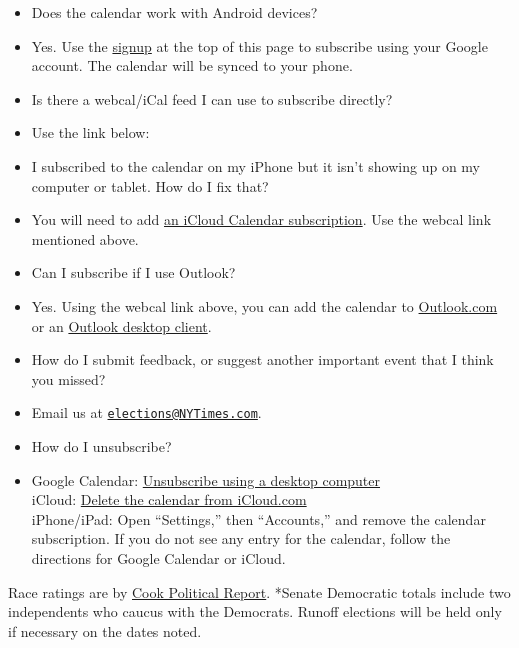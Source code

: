 \begin{itemize}
\tightlist
\item
  Does the calendar work with Android devices?
\item
  Yes. Use the \protect\hyperlink{promo-button-holder}{signup} at the
  top of this page to subscribe using your Google account. The calendar
  will be synced to your phone.
\item
  Is there a webcal/iCal feed I can use to subscribe directly?
\item
  Use the link below:
\item
  I subscribed to the calendar on my iPhone but it isn't showing up on
  my computer or tablet. How do I fix that?
\item
  You will need to add
  \href{https://support.apple.com/en-us/HT202361}{an iCloud Calendar
  subscription}. Use the webcal link mentioned above.
\item
  Can I subscribe if I use Outlook?
\item
  Yes. Using the webcal link above, you can add the calendar to
  \href{https://support.office.com/en-us/article/Import-or-subscribe-to-a-calendar-in-Outlook-com-or-Outlook-on-the-web-cff1429c-5af6-41ec-a5b4-74f2c278e98c}{Outlook.com}
  or an
  \href{https://support.office.com/en-us/article/View-and-subscribe-to-Internet-Calendars-7CD5D35A-4A90-4D70-A2F7-F6FADD7E2D9A}{Outlook
  desktop client}.
\item
  How do I submit feedback, or suggest another important event that I
  think you missed?
\item
  Email us at
  \href{mailto:elections@NYTimes.com}{\nolinkurl{elections@NYTimes.com}}.
\item
  How do I unsubscribe?
\item
  Google Calendar:
  \href{https://support.google.com/calendar/answer/37188}{Unsubscribe
  using a desktop computer}\\
  iCloud: \href{https://support.apple.com/kb/PH2679?locale=en_US}{Delete
  the calendar from iCloud.com}\\
  iPhone/iPad: Open ``Settings,'' then ``Accounts,'' and remove the
  calendar subscription. If you do not see any entry for the calendar,
  follow the directions for Google Calendar or iCloud.
\end{itemize}

Race ratings are by \href{https://www.cookpolitical.com/ratings/}{Cook
Political Report}. *Senate Democratic totals include two independents
who caucus with the Democrats. Runoff elections will be held only if
necessary on the dates noted.

